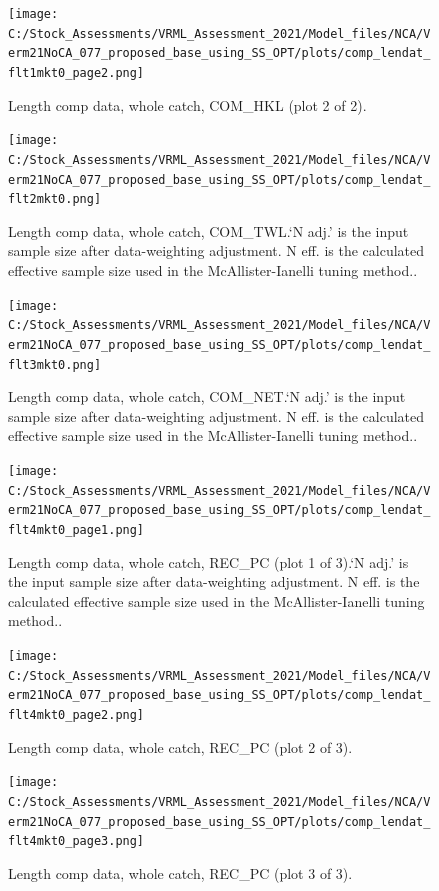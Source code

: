 \documentclass[11pt,
  english,
  a4paper,
]{article}
\begin{document}
\begin{figure}
\centering
\texttt{[image: C:/Stock\_Assessments/VRML\_Assessment\_2021/Model\_files/NCA/Verm21NoCA\_077\_proposed\_base\_using\_SS\_OPT/plots/comp\_lendat\_flt1mkt0\_page2.png]}
\caption{Length comp data, whole catch, COM\_HKL (plot 2 of 2).\label{fig:comp_lendat_flt1mkt0_page2}}
\end{figure}

\begin{figure}
\centering
\texttt{[image: C:/Stock\_Assessments/VRML\_Assessment\_2021/Model\_files/NCA/Verm21NoCA\_077\_proposed\_base\_using\_SS\_OPT/plots/comp\_lendat\_flt2mkt0.png]}
\caption{Length comp data, whole catch, COM\_TWL.`N adj.' is the input sample size after data-weighting adjustment. N eff. is the calculated effective sample size used in the McAllister-Ianelli tuning method..\label{fig:comp_lendat_flt2mkt0}}
\end{figure}

\begin{figure}
\centering
\texttt{[image: C:/Stock\_Assessments/VRML\_Assessment\_2021/Model\_files/NCA/Verm21NoCA\_077\_proposed\_base\_using\_SS\_OPT/plots/comp\_lendat\_flt3mkt0.png]}
\caption{Length comp data, whole catch, COM\_NET.`N adj.' is the input sample size after data-weighting adjustment. N eff. is the calculated effective sample size used in the McAllister-Ianelli tuning method..\label{fig:comp_lendat_flt3mkt0}}
\end{figure}

\begin{figure}
\centering
\texttt{[image: C:/Stock\_Assessments/VRML\_Assessment\_2021/Model\_files/NCA/Verm21NoCA\_077\_proposed\_base\_using\_SS\_OPT/plots/comp\_lendat\_flt4mkt0\_page1.png]}
\caption{Length comp data, whole catch, REC\_PC (plot 1 of 3).`N adj.' is the input sample size after data-weighting adjustment. N eff. is the calculated effective sample size used in the McAllister-Ianelli tuning method..\label{fig:comp_lendat_flt4mkt0_page1}}
\end{figure}

\begin{figure}
\centering
\texttt{[image: C:/Stock\_Assessments/VRML\_Assessment\_2021/Model\_files/NCA/Verm21NoCA\_077\_proposed\_base\_using\_SS\_OPT/plots/comp\_lendat\_flt4mkt0\_page2.png]}
\caption{Length comp data, whole catch, REC\_PC (plot 2 of 3).\label{fig:comp_lendat_flt4mkt0_page2}}
\end{figure}

\begin{figure}
\centering
\texttt{[image: C:/Stock\_Assessments/VRML\_Assessment\_2021/Model\_files/NCA/Verm21NoCA\_077\_proposed\_base\_using\_SS\_OPT/plots/comp\_lendat\_flt4mkt0\_page3.png]}
\caption{Length comp data, whole catch, REC\_PC (plot 3 of 3).\label{fig:comp_lendat_flt4mkt0_page3}}
\end{figure}
\end{document}
